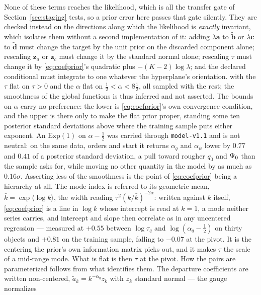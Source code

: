\documentclass[11pt]{article}
\theoremstyle{plain}
\begin{document}
None of these terms reaches the likelihood, which is all the transfer gate of
Section~\ref{sec:staging} tests, so a prior error here passes that gate silently. They are
checked instead on the directions along which the likelihood is \emph{exactly} invariant,
which isolates them without a second implementation of it: adding $\lambda\mathbf{a}$ to
$\tilde{\mathbf{b}}$ or $\lambda\mathbf{c}$ to $\tilde{\mathbf{d}}$ must change the target
by the unit prior on the discarded component alone; rescaling $\mathbf{z}_{a}$ or
$\mathbf{z}_{c}$ must change it by the standard normal alone; rescaling $\tau$ must change
it by \eqref{eq:coefprior}'s quadratic plus $-(K-2)\log\lambda$; and the declared
conditional must integrate to one whatever the hyperplane's orientation.
with the $\tau$ flat on $\tau > 0$ and the $\alpha$ flat on
$\tfrac{1}{2} < \alpha < 8\tfrac{1}{2}$, all
sampled with the rest; the smoothness of the global functions is
thus inferred and not asserted. The bounds on $\alpha$ carry no preference: the lower is
\eqref{eq:coefprior}'s own convergence condition, and the upper is there only to make the
flat prior proper, standing some ten posterior standard deviations above where the training
sample puts either exponent. An $\mathrm{Exp}(1)$ on $\alpha - \tfrac12$ was carried
through \texttt{model-v1.1} and is not neutral: on the same data, orders and start it
returns $\alpha_{q}$ and $\alpha_{\psi}$ lower by $0.77$ and $0.41$ of a posterior standard
deviation, a pull toward rougher $q_{0}$ and $\Psi_{0}$ than the sample asks for, while
moving no other quantity in the model by as much as $0.16\sigma$. Asserting less of the
smoothness is the point of \eqref{eq:coefprior} being a hierarchy at all. The mode index is referred to its geometric mean,
$\bar k = \exp\langle \log k\rangle$, the width reading
$\tau^{2}(k/\bar k)^{-2\alpha}$: written against $k$ itself, \eqref{eq:coefprior} is a
line in $\log k$ whose intercept is read at $k = 1$, a mode neither series carries, and
intercept and slope then correlate as in any uncentered regression --- measured at $+0.55$
between $\log\tau_{q}$ and $\log(\alpha_{q} - \tfrac12)$ on thirty objects and $+0.81$ on
the training sample, falling to $-0.07$ at the pivot. It is the centering the prior's own
information matrix picks out, and it makes $\tau$ the scale of a mid-range mode. What is
flat is then $\tau$ at the pivot. How the pairs are parameterized follows from what
identifies them. The departure coefficients are written non-centered,
$\tilde a_{k} = k^{-\alpha_{q}}z_{k}$ with $z_{k}$ standard normal --- the gauge normalizes
\end{document}
